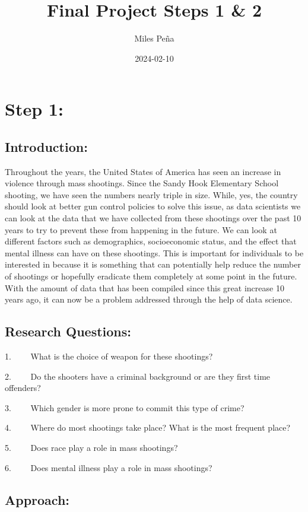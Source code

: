 \documentclass[
]{article}
\title{Final Project Steps 1 \& 2}
\author{Miles Peña}
\date{2024-02-10}
\begin{document}
\maketitle

\section{Step 1:}\label{step-1}

\subsection{Introduction:}\label{introduction}

Throughout the years, the United States of America has seen an increase
in violence through mass shootings. Since the Sandy Hook Elementary
School shooting, we have seen the numbers nearly triple in size. While,
yes, the country should look at better gun control policies to solve
this issue, as data scientists we can look at the data that we have
collected from these shootings over the past 10 years to try to prevent
these from happening in the future. We can look at different factors
such as demographics, socioeconomic status, and the effect that mental
illness can have on these shootings. This is important for individuals
to be interested in because it is something that can potentially help
reduce the number of shootings or hopefully eradicate them completely at
some point in the future. With the amount of data that has been compiled
since this great increase 10 years ago, it can now be a problem
addressed through the help of data science.

\subsection{Research Questions:}\label{research-questions}

1.~~~~ What is the choice of weapon for these shootings?

2.~~~~ Do the shooters have a criminal background or are they first time
offenders?

3.~~~~ Which gender is more prone to commit this type of crime?

4.~~~~ Where do most shootings take place? What is the most frequent
place?

5.~~~~ Does race play a role in mass shootings?

6.~~~~ Does mental illness play a role in mass shootings?

\subsection{Approach:}\label{approach}
\end{document}
